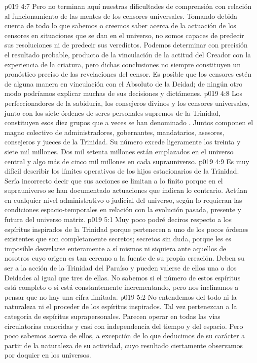 \vs p019 4:7 Pero no terminan aquí nuestras dificultades de comprensión con relación al funcionamiento de las mentes de los censores universales. Tomando debida cuenta de todo lo que sabemos o creemos saber acerca de la actuación de los censores en situaciones que se dan en el universo, no somos capaces de predecir sus resoluciones ni de predecir sus veredictos. Podemos determinar con precisión el resultado probable, producto de la vinculación de la actitud del Creador con la experiencia de la criatura, pero dichas conclusiones no siempre constituyen un pronóstico preciso de las revelaciones del censor. Es posible que los censores estén de alguna manera en vinculación con el Absoluto de la Deidad; de ningún otro modo podríamos explicar muchas de sus decisiones y dictámenes.
\vs p019 4:8 \pc Los perfeccionadores de la sabiduría, los consejeros divinos y los censores universales, junto con los siete órdenes de seres personales supremos de la Trinidad, constituyen esos diez grupos que a veces se han denominado . Juntos componen el magno colectivo de administradores, gobernantes, mandatarios, asesores, consejeros y jueces de la Trinidad. Su número excede ligeramente los treinta y siete mil millones. Dos mil setenta millones están emplazados en el universo central y algo más de cinco mil millones en cada suprauniverso.
\vs p019 4:9 Es muy difícil describir los límites operativos de los hijos estacionarios de la Trinidad. Sería incorrecto decir que sus acciones se limitan a lo finito porque en el suprauniverso se han documentado actuaciones que indican lo contrario. Actúan en cualquier nivel administrativo o judicial del universo, según lo requieran las condiciones espacio\hyp{}temporales en relación con la evolución pasada, presente y futura del universo matriz.
\vs p019 5:1 Muy poco podré deciros respecto a los espíritus inspirados de la Trinidad porque pertenecen a uno de los pocos órdenes existentes que son completamente secretos; secretos sin duda, porque les es imposible desvelarse enteramente a sí mismos ni siquiera ante aquellos de nosotros cuyo origen es tan cercano a la fuente de su propia creación. Deben su ser a la acción de la Trinidad del Paraíso y pueden valerse de ellos una o dos Deidades al igual que tres de ellas. No sabemos si el número de estos espíritus está completo o si está constantemente incrementando, pero nos inclinamos a pensar que no hay una cifra limitada.
\vs p019 5:2 No entendemos del todo ni la naturaleza ni el proceder de los espíritus inspirados. Tal vez pertenezcan a la categoría de espíritus suprapersonales. Parecen operar en todas las vías circulatorias conocidas y casi con independencia del tiempo y del espacio. Pero poco sabemos acerca de ellos, a excepción de lo que deducimos de su carácter a partir de la naturaleza de su actividad, cuyo resultado ciertamente observamos por doquier en los universos.
